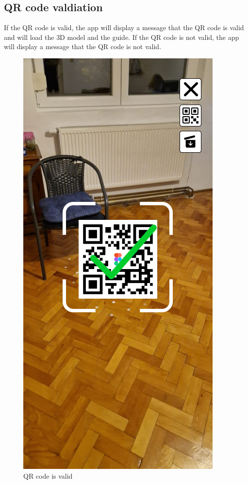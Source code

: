 \subsection{QR code valdiation}
If the \ac{QR} code is valid, the app will display a message that the \ac{QR} code is valid and will load the \ac{3D} model and the guide. If the \ac{QR} code is not valid, the app will display a message that the \ac{QR} code is not valid.

\begin{figure}[h!]
    \begin{center}
        \includegraphics[scale=0.5]{img/App_mock/iPhone 14 - 4.png}
        \caption{\ac{QR} code is valid}
        \label{fig:qr-valdiation}
    \end{center}
\end{figure}
\pagebreak

